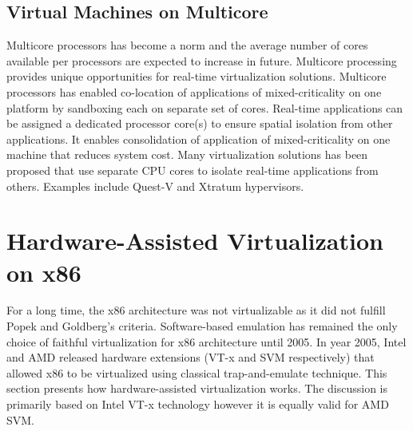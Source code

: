 
\subsection{Virtual Machines on Multicore}
Multicore processors has become a norm and the average number of cores available per processors are expected to increase in future.
Multicore processing provides unique opportunities for real-time virtualization solutions.
Multicore processors has enabled co-location of applications of mixed-criticality on one platform by sandboxing each on separate set of cores.
Real-time applications can be assigned a dedicated processor core(s) to ensure spatial isolation from other applications.
It enables consolidation of application of mixed-criticality on one machine that reduces system cost.
Many virtualization solutions has been proposed that use separate CPU cores to isolate real-time applications
from others. Examples include Quest-V \cite{West:2016:VSK:2966277.2935748} and Xtratum \cite {Carrascosa:2014:XHR:2668138.2668142} hypervisors.


\section{Hardware-Assisted Virtualization on x86}
For a long time, the x86 architecture was not virtualizable as it did not fulfill Popek and Goldberg's criteria.
Software-based emulation has remained the only choice of faithful virtualization for x86 architecture until 2005.
In year 2005, Intel \cite{uhlig2005intel} and AMD released hardware extensions (VT-x and SVM respectively) that allowed x86 to be virtualized using classical trap-and-emulate technique.
This section presents how hardware-assisted virtualization works.
The discussion is primarily based on Intel VT-x technology however it is equally valid for AMD SVM.


